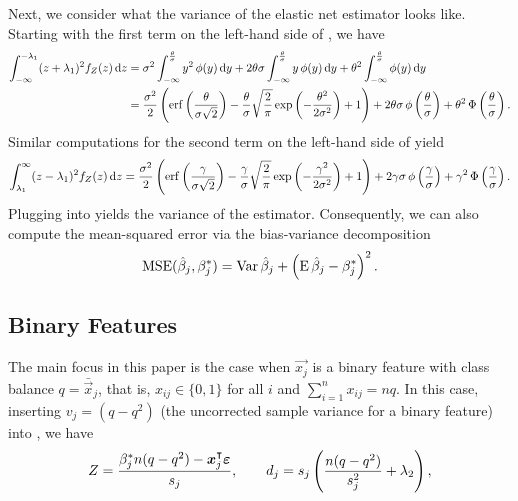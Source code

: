 Next, we consider what the variance of the elastic net estimator looks like.
Starting with the first term on the left-hand side of , we have
\begin{align}
  \label{eq:mc-var-part1}
  \int_{-\infty}^{-\lambda_1}(z+ \lambda_1)^2 f_Z(z) \mathop{}\!\mathrm{d} z & = \sigma^2 \int_{-\infty}^{\frac{\theta}{\sigma}} y^2 \operatorname{\phi}(y) \mathop{}\!\mathrm{d} y + 2 \theta \sigma \int_{-\infty}^{\frac{\theta}{\sigma}} y \operatorname{\phi}(y) \mathop{}\!\mathrm{d} y + \theta^2 \int_{-\infty}^{\frac{\theta}{\sigma}} \operatorname{\phi}(y) \mathop{}\!\mathrm{d} y                                                                               \nonumber \\
                                                           & = \frac{\sigma^2}{2} \left( \operatorname{erf}\left(\frac{\theta}{\sigma\sqrt{2}}\right) - \frac{\theta}{\sigma}\sqrt{\frac{2}{\pi}} \exp\left(-\frac{\theta^2}{2\sigma^2}\right) + 1 \right) + 2 \theta \sigma \operatorname{\phi} \left(\frac{\theta}{\sigma}\right) + \theta^2 \operatorname{\Phi}\left(\frac{\theta}{\sigma}\right).
\end{align}
Similar computations for the second term on the left-hand side of  yield
\begin{equation}
  \label{eq:mc-var-part2}
  \int_{\lambda_1}^{\infty}(z - \lambda_1)^2 f_Z(z) \mathop{}\!\mathrm{d} z = \frac{\sigma^2}{2} \left( \operatorname{erf}\left(\frac{\gamma}{\sigma\sqrt{2}}\right) - \frac{\gamma}{\sigma}\sqrt{\frac{2}{\pi}} \exp\left(-\frac{\gamma^2}{2\sigma^2}\right) + 1 \right) + 2 \gamma \sigma \operatorname{\phi} \left(\frac{\gamma}{\sigma}\right) + \gamma^2 \operatorname{\Phi}\left(\frac{\gamma}{\sigma}\right).
\end{equation}
Plugging  into  yields the variance of the estimator. Consequently, we can also compute the mean-squared error via the bias-variance decomposition
\begin{equation*}
  \label{eq:betahat-mse}
  \operatorname{MSE} (\hat\beta_j, \beta^*_j) = \operatorname{Var}\hat\beta_j + \left(\operatorname{E} \hat\beta_j - \beta^*_j\right)^2.
\end{equation*}

\subsection{Binary Features}\label{sec:theory-binary-features}

The main focus in this paper is the case when \(\vec{x_j}\) is a binary feature with class balance \(q = \bar{\vec{x}}_j\), that is, \(x_{ij} \in \{0, 1\}\) for all \(i\) and \(\sum_{i=1}^n x_{ij} = nq\).
In this case, inserting \(v_j = (q - q^2)\) (the uncorrected sample variance for a binary feature) into , we have
\[
  Z = \frac{\beta_j^* n(q - q^2) - \boldsymbol{x}_j^\intercal \boldsymbol{\varepsilon}}{s_j}
  ,\qquad
  d_j = s_j\left(\frac{n(q - q^2)}{s_j^2} + \lambda_2\right),
\]

